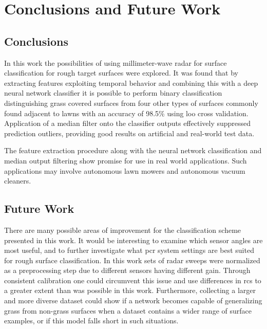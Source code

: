 \chapter{Conclusions and Future Work}

\section{Conclusions}

In this work the possibilities of using millimeter-wave radar for surface classification for rough target surfaces were explored. It was found that by extracting features exploiting temporal behavior and combining this with a deep neural network classifier it is possible to perform binary classification distinguishing grass covered surfaces from four other types of surfaces commonly found adjacent to lawns with an accuracy of 98.5\% using \gls{loo} cross validation. Application of a median filter onto the classifier outputs effectively suppressed prediction outliers, providing good results on artificial and real-world test data. 

The feature extraction procedure along with the neural network classification and median output filtering show promise for use in real world applications. Such applications may involve autonomous lawn mowers and autonomous vacuum cleaners. 



\section{Future Work}

There are many possible areas of improvement for the classification scheme presented in this work. It would be interesting to examine which sensor angles are most useful, and to further investigate what \gls{pcr} system settings are best suited for rough surface classification. In this work sets of radar sweeps were normalized as a preprocessing step due to different sensors having different gain. Through consistent calibration one could circumvent this issue and use differences in \gls{rcs} to a greater extent than was possible in this work. Furthermore, collecting a larger and more diverse dataset could show if a network becomes capable of generalizing grass from non-grass surfaces when a dataset contains a wider range of surface examples, or if this model falls short in such situations. 

